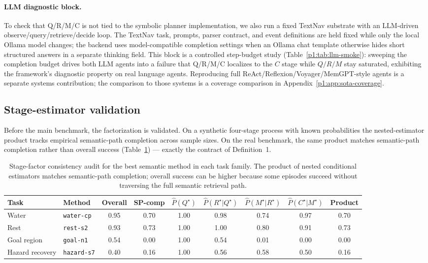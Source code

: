 \documentclass{article}
\begin{document}
\paragraph{LLM diagnostic block.}
To check that Q/R/M/C is not tied to the symbolic planner implementation, we also run a fixed TextNav substrate with an LLM-driven observe/query/retrieve/decide loop. The TextNav task, prompts, parser contract, and event definitions are held fixed while only the local Ollama model changes; the backend uses model-compatible completion settings when an Ollama chat template otherwise hides short structured answers in a separate thinking field. This block is a controlled step-budget study (Table~\ref{p1:tab:llm-smoke}): sweeping the completion budget drives both LLM agents into a failure that Q/R/M/C localizes to the $C$ stage while $Q/R/M$ stay saturated, exhibiting the framework's diagnostic property on real language agents. Reproducing full ReAct/Reflexion/Voyager/MemGPT-style agents is a separate systems contribution; the comparison to those systems is a coverage comparison in Appendix~\ref{p1:app:sota-coverage}.

\subsection{Stage-estimator validation}
\label{p1:sec:validation}

Before the main benchmark, the factorization is validated. On a
synthetic four-stage process with known probabilities the
nested-estimator product tracks empirical semantic-path completion
across sample sizes. On the real benchmark, the same product matches
semantic-path completion rather than overall success
(Table~\ref{p1:tab:consistency}) --- exactly the contract of
Definition~1.

\begin{table}[t]
  \caption{Stage-factor consistency audit for the best semantic method in each task family. The product of nested conditional estimators matches semantic-path completion; overall success can be higher because some episodes succeed without traversing the full semantic retrieval path.}
  \label{p1:tab:consistency}
  \centering
  \small
  \begin{tabular}{p{1.7cm}p{2.5cm}c c c c c c c}
    \toprule
    Task & Method & Overall & SP-comp & $\hat P(Q^\star)$ & $\hat P(R^\star|Q^\star)$ & $\hat P(M^\star|R^\star)$ & $\hat P(C^\star|M^\star)$ & Product \\
    \midrule
    Water & \texttt{water-cp} & 0.95 & 0.70 & 1.00 & 0.98 & 0.74 & 0.97 & 0.70 \\
    Rest & \texttt{rest-s2} & 0.93 & 0.73 & 1.00 & 1.00 & 0.80 & 0.91 & 0.73 \\
    Goal region & \texttt{goal-n1} & 0.54 & 0.00 & 1.00 & 0.54 & 0.01 & 0.00 & 0.00 \\
    Hazard recovery & \texttt{hazard-s7} & 0.40 & 0.16 & 1.00 & 0.56 & 0.58 & 0.50 & 0.16 \\
    \bottomrule
  \end{tabular}
\end{table}
\end{document}
